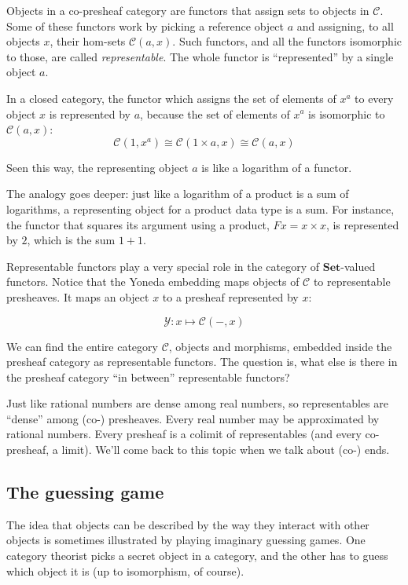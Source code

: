 \documentclass[DaoFP]{subfiles}
\begin{document}
Objects in a  co-presheaf category are functors that assign sets to objects in $\mathcal{C}$. Some of these functors work by picking a reference object $a$ and assigning,  to all objects $x$, their hom-sets  $\mathcal{C}(a, x)$. Such functors, and all the functors isomorphic to those, are called \emph{representable}. The whole functor is ``represented'' by a single object $a$. 

In a closed category, the functor which assigns the set of elements of $x^a$ to every object $x$ is represented by $a$, because the set of elements of $x^a$ is isomorphic to $\mathcal{C}(a, x)$:
\[\mathcal{C}(1, x^a) \cong \mathcal{C}(1 \times a, x) \cong \mathcal{C} (a, x)\]

Seen this way, the representing object $a$ is like a logarithm of a functor. 

The analogy goes deeper: just like a logarithm of a product is a sum of logarithms, a representing object for a product data type is a sum. For instance, the functor that squares its argument using a product, $F x = x \times x$, is represented by $2$, which is the sum $1 + 1$. 

Representable functors play a very special role in the category of $ \mathbf{Set}$-valued functors. Notice that the Yoneda embedding maps objects of $\mathcal{C}$ to representable presheaves. It maps an object $x$ to a presheaf represented by $x$: 

\[  \mathcal{Y} \colon x \mapsto \mathcal{C}(-, x) \]

We can find the entire category  $\mathcal{C}$, objects and morphisms, embedded inside the presheaf category as representable functors. The question is, what else is there in the presheaf category ``in between'' representable functors?

Just like rational numbers are dense among real numbers, so representables are ``dense'' among (co-) presheaves. Every real number may be approximated by rational numbers. Every presheaf is a colimit of representables (and every co-presheaf, a limit). We'll come back to this topic when we talk about (co-) ends.

\subsection{The guessing game}

The idea that objects can be described by the way they interact with other objects is sometimes illustrated by playing imaginary guessing games. One category theorist picks a secret object in a category, and the other has to guess which object it is (up to isomorphism, of course). 
\end{document}
